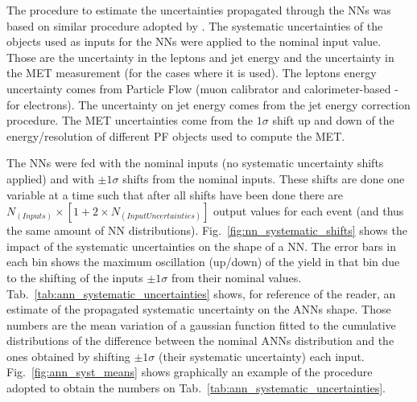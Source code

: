 The procedure to estimate the uncertainties propagated through the NNs was based on similar procedure adopted by \cite{bib:CMS-AN-12-141, bib:CMS-PAS-HIG-16-022, bib:ATLAS-CONF-2017-041}. The systematic uncertainties of the objects used as inputs for the NNs were applied to the nominal input value. Those are the uncertainty in the leptons and jet energy and the uncertainty in the MET measurement (for the cases where it is used). The leptons energy uncertainty comes from Particle Flow (muon calibrator and calorimeter-based - for electrons). The uncertainty on jet energy comes from the jet energy correction procedure. The MET uncertainties come from the $1\sigma$ shift up and down of the energy/resolution of different PF objects used to compute the MET.

The NNs were fed with the nominal inputs (no systematic uncertainty shifts applied) and with $\pm 1 \sigma$ shifts from the nominal inputs. These shifts are done one variable at a time such that after all shifts have been done there are $N_{(Inputs)} \times [1+2 \times N_{(InputUncertainties)}]$ output values for each event (and thus the same amount of NN distributions). Fig.~\ref{fig:nn_systematic_shifts} shows the impact of the systematic uncertainties on the shape of a NN. The error bars in each bin shows the maximum oscillation (up/down) of the yield in that bin due to the shifting of the inputs $\pm 1 \sigma$ from their nominal values. Tab.~\ref{tab:ann_systematic_uncertainties} shows, for reference of the reader, an estimate of the propagated systematic uncertainty on the ANNs shape. Those numbers are the mean variation of a gaussian function fitted to the cumulative distributions of the difference between the nominal ANNs distribution and the ones obtained by shifting $\pm1 \sigma$ (their systematic uncertainty) each input. Fig.~\ref{fig:ann_syst_means} shows graphically an example of the procedure adopted to obtain the numbers on Tab.~\ref{tab:ann_systematic_uncertainties}.

